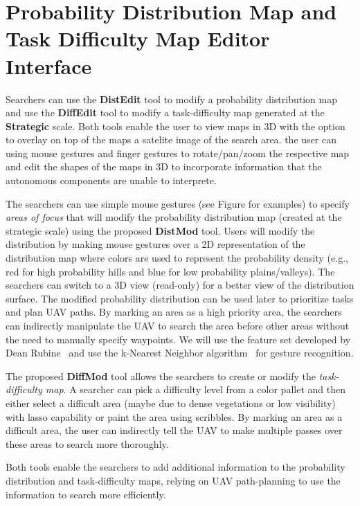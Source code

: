 \chapter[Probability Distribution Map and Task Difficulty Map Editor Interface]{Probability Distribution Map and Task Difficulty Map Editor Interface}
\label{chap:MapEdit}



Searchers can use the \textbf{DistEdit} tool to modify a probability distribution map and use the \textbf{DiffEdit} tool to modify a task-difficulty map generated at the \textbf{Strategic} scale. Both tools enable the user to view maps in 3D with the option to overlay on top of the maps a satelite image of the search area. the user can using mouse gestures and finger gestures to rotate/pan/zoom the respective map and edit the shapes of the maps in 3D to incorporate information that the autonomous components are unable to interprete. 

The searchers can use simple mouse gestures (see Figure  for examples) to specify \textit{areas of focus} that will modify the probability distribution map (created at the strategic scale) using the proposed \textbf{DistMod} tool. Users will modify the distribution by making mouse gestures over a 2D representation of the distribution map where colors are used to represent the probability density (e.g., red for high probability hills and blue for low probability plains/valleys). The searchers can switch to a 3D view (read-only) for a better view of the distribution surface. The modified probability distribution can be used later to prioritize tasks and plan UAV paths. By marking an area as a high priority area, the searchers can indirectly manipulate the UAV to search the area before other areas without the need to manually specify waypoints. We will use the feature set developed by Dean Rubine~\cite{Rubine1991Specifying} and use the k-Nearest Neighbor algorithm~\cite{Mitchell1997Machine} for gesture recognition.

The proposed \textbf{DiffMod} tool allows the searchers to create or modify the \textit{task-difficulty map}. A searcher can pick a difficulty level from a color pallet and then either select a difficult area (maybe due to dense vegetations or low visibility) with lasso capability or paint the area using scribbles. By marking an area as a difficult area, the user can indirectly tell the UAV to make multiple passes over these areas to search more thoroughly.

Both tools enable the searchers to add additional information to the probability distribution and task-difficulty maps, relying on UAV path-planning to use the information to search more efficiently.

